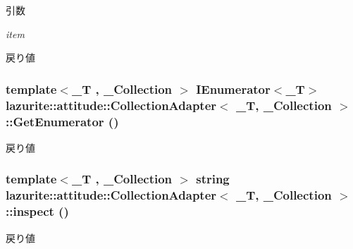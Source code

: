 \begin{DoxyParams}{引数}
\item[{\em item}]\end{DoxyParams}
\begin{DoxyReturn}{戻り値}

\end{DoxyReturn}
\hypertarget{classlazurite_1_1attitude_1_1_collection_adapter_3_01___t_00_01___collection_01_4_a0c0fe3a99412b13632b28b92a759d537}{
\subsubsection[{GetEnumerator}]{\setlength{\rightskip}{0pt plus 5cm}template$<$\_\-T , \_\-Collection $>$ IEnumerator$<$\_\-T$>$ lazurite::attitude::CollectionAdapter$<$ \_\-T, \_\-Collection $>$::GetEnumerator ()}}
\label{classlazurite_1_1attitude_1_1_collection_adapter_3_01___t_00_01___collection_01_4_a0c0fe3a99412b13632b28b92a759d537}
\begin{DoxyReturn}{戻り値}

\end{DoxyReturn}
\hypertarget{classlazurite_1_1attitude_1_1_collection_adapter_3_01___t_00_01___collection_01_4_a1d80bf87069fedc91947a37300e4b98e}{
\subsubsection[{inspect}]{\setlength{\rightskip}{0pt plus 5cm}template$<$\_\-T , \_\-Collection $>$ string lazurite::attitude::CollectionAdapter$<$ \_\-T, \_\-Collection $>$::inspect ()}}
\label{classlazurite_1_1attitude_1_1_collection_adapter_3_01___t_00_01___collection_01_4_a1d80bf87069fedc91947a37300e4b98e}
\begin{DoxyReturn}{戻り値}

\end{DoxyReturn}
